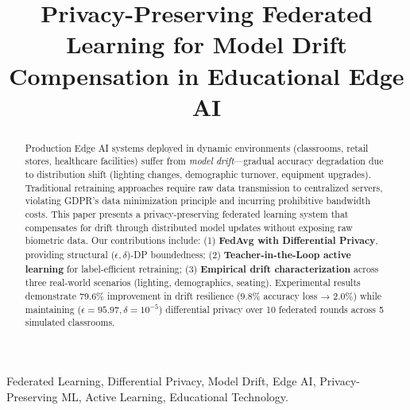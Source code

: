 \documentclass[conference]{IEEEtran}
\begin{document}
\title{Privacy-Preserving Federated Learning for Model Drift Compensation in Educational Edge AI}

\author{
}

\maketitle

\begin{abstract}
Production Edge AI systems deployed in dynamic environments (classrooms, retail stores, healthcare facilities) suffer from \textit{model drift}—gradual accuracy degradation due to distribution shift (lighting changes, demographic turnover, equipment upgrades). Traditional retraining approaches require raw data transmission to centralized servers, violating GDPR's data minimization principle and incurring prohibitive bandwidth costs. This paper presents a privacy-preserving federated learning system that compensates for drift through distributed model updates without exposing raw biometric data. Our contributions include: (1) \textbf{FedAvg with Differential Privacy}, providing structural ($\epsilon, \delta$)-DP boundedness; (2) \textbf{Teacher-in-the-Loop active learning} for label-efficient retraining; (3) \textbf{Empirical drift characterization} across three real-world scenarios (lighting, demographics, seating). Experimental results demonstrate 79.6\% improvement in drift resilience (9.8\% accuracy loss → 2.0\%) while maintaining ($\epsilon=95.97, \delta=10^{-5}$) differential privacy over 10  federated rounds across 5 simulated classrooms.
\end{abstract}

\begin{IEEEkeywords}
Federated Learning, Differential Privacy, Model Drift, Edge AI, Privacy-Preserving ML, Active Learning, Educational Technology.
\end{IEEEkeywords}
\end{document}
